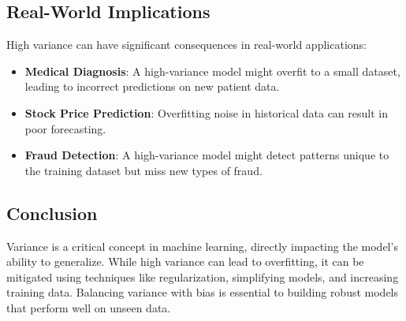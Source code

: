 \subsection*{Real-World Implications}
High variance can have significant consequences in real-world applications:

\begin{itemize}
    \item \textbf{Medical Diagnosis}: A high-variance model might overfit to a small dataset, leading to incorrect predictions on new patient data.
    \item \textbf{Stock Price Prediction}: Overfitting noise in historical data can result in poor forecasting.
    \item \textbf{Fraud Detection}: A high-variance model might detect patterns unique to the training dataset but miss new types of fraud.
\end{itemize}

\subsection*{Conclusion}
Variance is a critical concept in machine learning, directly impacting the model's ability to generalize. While high variance can lead to overfitting, it can be mitigated using techniques like regularization, simplifying models, and increasing training data. Balancing variance with bias is essential to building robust models that perform well on unseen data.

